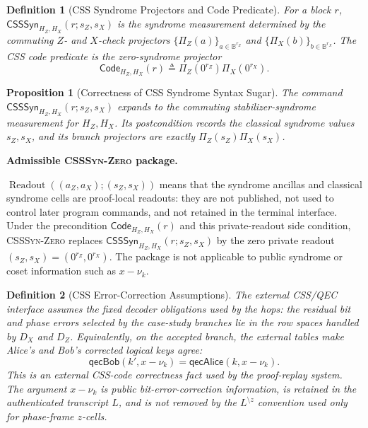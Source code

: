 \documentclass[conference,compsoc]{IEEEtran}
\newtheorem{definition}{Definition}
\newtheorem{proposition}{Proposition}
\begin{document}
\begin{definition}[CSS Syndrome Projectors and Code Predicate]
For a block \(r\), \(\mathsf{CSSSyn}_{H_Z,H_X}(r;s_Z,s_X)\) is the syndrome
measurement determined by the commuting \(Z\)- and \(X\)-check projectors
\(\{\Pi_Z(a)\}_{a\in\mathbb B^{r_Z}}\) and
\(\{\Pi_X(b)\}_{b\in\mathbb B^{r_X}}\). The CSS code predicate is the
zero-syndrome projector
\[
\mathsf{Code}_{H_Z,H_X}(r)
\triangleq
\Pi_Z(0^{r_Z})\Pi_X(0^{r_X}) .
\]
\end{definition}

\begin{proposition}[Correctness of CSS Syndrome Syntax Sugar]
\label{prop:csssyn-expansion}
The command \(\mathsf{CSSSyn}_{H_Z,H_X}(r;s_Z,s_X)\) expands to the commuting
stabilizer-syndrome measurement for \(H_Z,H_X\). Its postcondition records the
classical syndrome values \(s_Z,s_X\), and its branch projectors are exactly
\(\Pi_Z(s_Z)\Pi_X(s_X)\).
\end{proposition}

\noindent\textbf{Admissible \textsc{CSSSyn-Zero} package.}

\(\operatorname{Readout}((a_Z,a_X);(s_Z,s_X))\) means that the syndrome
ancillas and classical syndrome cells are proof-local readouts: they are not
published, not used to control later program commands, and not retained in the
terminal interface. Under the precondition
\(\mathsf{Code}_{H_Z,H_X}(r)\) and this private-readout side condition,
\textsc{CSSSyn-Zero} replaces
\(\mathsf{CSSSyn}_{H_Z,H_X}(r;s_Z,s_X)\) by the zero private readout
\((s_Z,s_X)=(0^{r_Z},0^{r_X})\). The package is not applicable to public
syndrome or coset information such as \(x-\nu_k\).

\begin{definition}[CSS Error-Correction Assumptions]
The external CSS/QEC interface assumes the fixed decoder obligations used by the
hops: the residual bit and phase errors selected by the case-study
branches lie in the row spaces handled by \(D_X\) and \(D_Z\). Equivalently, on
the accepted branch, the external tables make Alice's and Bob's corrected
logical keys agree:
\[
\mathsf{qecBob}(k',x-\nu_k)
=
\mathsf{qecAlice}(k,x-\nu_k).
\]
This is an external CSS-code correctness fact used by the proof-replay system. The
argument \(x-\nu_k\) is public bit-error-correction information, is retained in
the authenticated transcript \(L\), and is not removed by the
\(L^{\setminus z}\) convention used only for phase-frame \(z\)-cells.
\end{definition}
\end{document}
